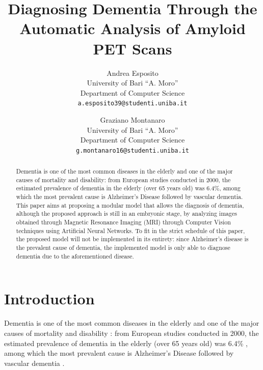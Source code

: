 \documentclass[10pt,twocolumn,letterpaper]{article}
\begin{document}
\title{Diagnosing Dementia Through the Automatic Analysis of Amyloid PET Scans}

\author{%
  Andrea Esposito\\
  University of Bari ``A. Moro''\\
  Department of Computer Science\\
  {\tt\small a.esposito39@studenti.uniba.it}
  \and
  Graziano Montanaro\\
  University of Bari ``A. Moro''\\
  Department of Computer Science\\
  {\tt\small g.montanaro16@studenti.uniba.it}
}

\maketitle

\begin{abstract}
  Dementia is one of the most common diseases in the elderly and one of the
  major causes of mortality and disability: from European studies conducted in
  2000, the estimated prevalence of dementia in the elderly (over 65 years old)
  was 6.4\%, among which the most prevalent cause is Alzheimer's Disease
  followed by vascular dementia. This paper aims at proposing a modular model
  that allows the diagnosis of dementia, although the proposed approach is still
  in an embryonic stage, by analyzing images obtained through Magnetic Resonance
  Imaging (MRI) through Computer Vision techniques using Artificial Neural
  Networks. To fit in the strict schedule of this paper, the proposed model will
  not be implemented in its entirety: since Alzheimer's disease is the prevalent
  cause of dementia, the implemented model is only able to diagnose dementia due
  to the aforementioned disease.
\end{abstract}

\section{Introduction}
\label{sec:introduction}


Dementia is one of the most common diseases in the elderly and one of the major
causes of mortality and disability \cite{Berr2005}: from European studies
conducted in 2000, the estimated prevalence of dementia in the elderly (over 65
years old) was 6.4\% \cite{Barkhof2016}, among which the most prevalent cause is
Alzheimer's Disease followed by vascular dementia \cite{Barkhof2016}.
\end{document}
